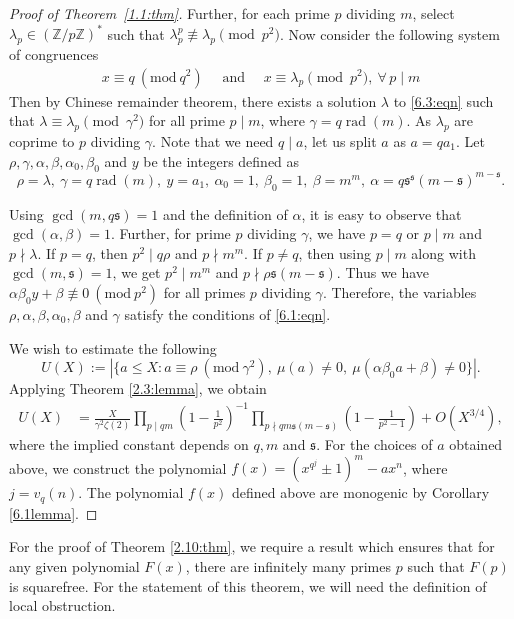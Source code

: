 \documentclass[table]{amsart}
\newcommand{\Mod}[1]{\ (\mathrm{mod}\ #1)} %
\newcommand{\sfrak}{\mathfrak{s}}
\renewcommand{\a}{\alpha}
\newcommand{\ao}{\alpha_0}
\renewcommand{\b}{\beta}
\newcommand{\bo}{\beta_0}
\newcommand{\rad}{\operatorname{rad}}
\newcommand{\Z}{\mathbb{Z}}
\numberwithin{equation}{section}
\begin{document}
\begin{proof}[Proof of Theorem~\ref{1.1:thm}]
    Further, for each prime $p$ dividing $m$, select $\lambda_p \in (\Z/p\Z)^*$ such that $\lambda_p^p \not\equiv \lambda_p \pmod{p^2}$. Now consider the following system of congruences
    \begin{align} \label{6.3:eqn}
        x \equiv q \Mod{q^2} \quad \text{ and } \quad x \equiv \lambda_p \pmod{p^2},~ \forall\, p \mid m 
    \end{align}
    Then by Chinese remainder theorem, there exists a solution $\lambda$ to \eqref{6.3:eqn} such that $\lambda \equiv \lambda_p \pmod{\gamma^2}$ for all prime $p \mid m$, where $\gamma = q\rad(m)$. As $\lambda_p$ are coprime to $p$ dividing $\gamma$. Note that we need $q \mid a$, let us split $a$ as $a= q a_1$. Let $\rho, \gamma, \a,\b,\ao,\bo$ and $y$ be the integers defined as
    $$ \rho=\lambda, ~ \gamma= q\rad(m),  ~ y=a_1, ~ \a_0=1, ~ \bo=1, ~ \beta=m^m,  ~\a= q\sfrak^{\sfrak} (m-\sfrak)^{m-\sfrak}. $$
    
    Using $\gcd(m,q\sfrak)=1$ and the definition of $\a$, it is easy to observe that $\gcd(\a,\b)=1$. Further, for prime $p$ dividing $\gamma$, we have $p=q$ or $p \mid m$ and $p \nmid \lambda$. If $p=q$, then $p^2 \mid q\rho $ and $p \nmid m^m$. If $p\neq q$, then using $p \mid m$ along with $\gcd(m,\sfrak)=1$, we get $p^2 \mid m^m$ and $p \nmid \rho\sfrak(m-\sfrak)$. Thus we have $\a\bo y + \b \not\equiv 0 \Mod{p^2}$ for all primes $p$ dividing $\gamma$. Therefore, the variables $\rho, \a,\b,\ao,\b$ and $\gamma$ satisfy the conditions of \eqref{6.1:eqn}.
    
    We wish to estimate the following
    $$ U(X) := | \{ a \leq X : a \equiv \rho \Mod{\gamma^2}, ~\mu(a) \neq 0, ~\mu(\a\bo a+\b) \neq 0 \} |. $$
    Applying Theorem \ref{2.3:lemma}, we obtain
    \begin{align*}
        U(X) &=  \frac{X}{\gamma^2 \zeta(2)} \prod_{p \mid qm} \left( 1- \frac{1}{p^2}\right)^{-1} \prod_{p \nmid qm\sfrak (m-\sfrak)} \left( 1-\frac{1}{p^2-1} \right) + O(X^{3/4}),
    \end{align*}
    where the implied constant depends on $q,m$ and $\sfrak$. For the choices of $a$ obtained above, we construct the polynomial $f(x) = (x^{q^j} \pm 1)^m - a x^{n}$, where $j =v_q(n)$. The polynomial $f(x)$ defined above are monogenic by Corollary \ref{6.1lemma}.
\end{proof}

For the proof of Theorem \ref{2.10:thm}, we require a result which ensures that for any given polynomial $F(x)$, there are infinitely many primes $p$ such that $F(p)$ is squarefree. For the statement of this theorem, we will need the definition of local obstruction.
\end{document}
